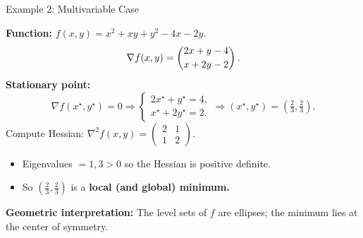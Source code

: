 \documentclass[aspectratio=169]{beamer}
\begin{document}
\begin{frame}{Example 2: Multivariable Case}

\textbf{Function: } \(f(x,y) = x^2 + xy + y^2 - 4x - 2y.\)
\vspace{-2mm}
\pause
\[
\nabla f(x,y) =
\begin{pmatrix}
2x + y - 4 \\[2pt]
x + 2y - 2
\end{pmatrix}.
\vspace{-3mm}
\]
\vspace{-3mm}
\textbf{Stationary point:}
\[
\nabla f(x^\star,y^\star)=0
\Rightarrow
\begin{cases}
2x^\star + y^\star = 4,\\
x^\star + 2y^\star = 2.
\end{cases}
\Rightarrow
(x^\star,y^\star) = \left(\tfrac{2}{3}, \tfrac{2}{3}\right).
\]
\pause
Compute Hessian:
$
\nabla^2 f(x,y)=
\begin{pmatrix}
2 & 1\\[2pt]
1 & 2
\end{pmatrix}.
$

\begin{itemize}
  \item Eigenvalues \(= 1,3 > 0\) so the Hessian is positive definite.
  \item So \((\tfrac{2}{3},\tfrac{2}{3})\) is a \textbf{local (and global) minimum.}
\end{itemize}
\pause
\vspace{0.4em}
\textbf{Geometric interpretation:}  
The level sets of \(f\) are ellipses; the minimum lies at the center of symmetry.
\pause
\end{frame}
\end{document}
